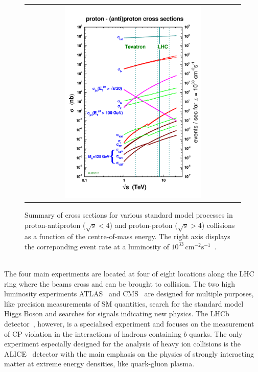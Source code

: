 \begin{figure}[!t]
  \centering
  \begin{tabular}{c}
    \includegraphics[width=0.65\textwidth]{figures/crosssections2012_v5-1.pdf}
  \end{tabular}
  \caption{Summary of cross sections for various standard model processes in proton-antiproton ($\sqrt{s} < 4$\tev) and proton-proton ($\sqrt{s} > 4$\tev) collisions as a function of the centre-of-mass energy. The right axis displays the correponding event rate at a luminosity of $\mathrm{10^{33}\,cm^{-2} s^{-1}}$~\cite{bib:stirling:pcom}.}
  \label{fig:CrossSections}
\end{figure}
\\
The four main experiments are located at four of eight locations along the LHC ring where the beams cross and can be brought to collision. The two high luminosity experiments ATLAS~\cite{det::ATLAS} and CMS~\cite{Chatrchyan:2008zzk, bib:cmsptdr1} are designed for multiple purposes, like precision measurements of SM quantities, search for the standard model Higgs Boson and searches for signals indicating new physics. The LHCb detector~\cite{det::LHCb}, however, is a specialised experiment and focuses on the measurement of CP violation in the interactions of hadrons containing $b$ quarks. The only experiment especially designed for the analysis of heavy ion collisions is the ALICE~\cite{det::ALICE} detector with the main emphasis on the physics of strongly interacting matter at extreme energy densities, like quark-gluon plasma.

